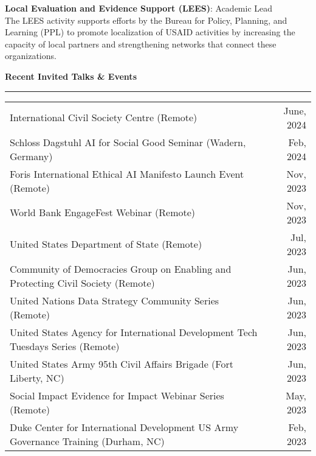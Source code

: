 \documentclass[11pt]{article}
\begin{document}
\textbf{Local Evaluation and Evidence Support (LEES)}: Academic Lead\\
The LEES activity supports efforts by the Bureau for Policy, Planning, and Learning (PPL) to promote localization of USAID activities by increasing the capacity of local partners and strengthening networks that connect these organizations.




\bigskip
\textbf{\large Recent Invited Talks \& Events}\\
\rule[3mm]{\textwidth}{.2pt}
\noindent\begin{tabular*}{\textwidth}{@{}l@{\extracolsep{\fill}}r@{}}
International Civil Society Centre (Remote) & June, 2024\\

Schloss Dagstuhl AI for Social Good Seminar (Wadern, Germany) & Feb, 2024\\

Foris International Ethical AI Manifesto Launch Event (Remote) & Nov, 2023\\

World Bank EngageFest Webinar (Remote) & Nov, 2023\\

United States Department of State (Remote) & Jul, 2023\\

Community of Democracies Group on Enabling and Protecting Civil Society (Remote) & Jun, 2023\\

United Nations Data Strategy Community Series (Remote) & Jun, 2023\\

United States Agency for International Development Tech Tuesdays Series (Remote) & Jun, 2023\\

United States Army 95th Civil Affairs Brigade (Fort Liberty, NC) & Jun, 2023\\

Social Impact Evidence for Impact Webinar Series (Remote) & May, 2023\\


Duke Center for International Development US Army Governance Training (Durham, NC) & Feb, 2023\\


\end{tabular*}
\end{document}
